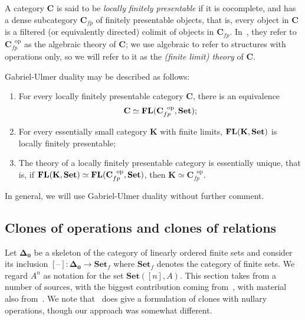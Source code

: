 \documentclass[11pt, a4paper, twoside,leqno]{amsart}
\newcommand{\cat}[1]{\mathbf{#1}}
\newcommand{\thg}{{\mathord{\text{--}}}}
\numberwithin{equation}{section}
\theoremstyle{plain}
\theoremstyle{definition}
\newcommand{\Set}{\cat{Set}}
\DeclareMathOperator{\FL}{\bf FL}
\begin{document}
A category \(\cat{C}\) is said to be \emph{locally finitely presentable} if it is
cocomplete, and has a dense subcategory \(\cat{C}_{fp}\) of finitely
presentable objects, that is, every object in \(\cat{C}\) is a filtered (or equivalently
directed) colimit of objects in \(\cat{C}_{fp}\).
In~\cite{Adamek:1998aa}, they refer to \(\cat{C}_{fp}^{\;\;\mathrm{op}}\)
as the algebraic theory of \(\cat{C}\); we use algebraic
to refer to structures with operations only, so we
will refer to it as the \emph{(finite limit) theory} of \(\cat{C}\).

Gabriel-Ulmer duality may be described as follows:
\begin{enumerate}[label=(\Roman*), ref=(\Roman*)]
  \item
    \label{it:lfp-to-th}
    For every locally finitely presentable category \(\cat{C}\), there is
an equivalence
\begin{equation*}
  \cat{C} \simeq \FL(\cat{C}_{fp}^{\;\;\mathrm{op}},\Set);
\end{equation*}
\item
  \label{it:th-to-lfp}
  For every essentially small category \(\cat{K}\) with finite
limits, \(\FL(\cat{K},\Set)\) is locally finitely
presentable;
\item
  \label{it:th-lfp-unique}
  The theory of a locally finitely presentable category is essentially
  unique, that is, if \( \FL(\cat{K},\Set) \simeq
\FL(\cat{C}_{fp}^{\;\;\mathrm{op}},\Set)\), then
\(\cat{K}\simeq \cat{C}_{fp}^{\;\;\mathrm{op}}\).
\end{enumerate}

In general, we will use Gabriel-Ulmer duality without further comment.


\subsection{Clones of operations and clones of relations}
\label{sec:clones-rel-clones}

Let \(\cat{\Delta_{0}}\) be a skeleton of the category of linearly
ordered finite
sets and consider its inclusion \([\thg] \colon
\cat{\Delta_{0}} \rightarrow \cat{Set}_{f}\) where \(\cat{Set}_{f}\) denotes
the category of finite sets. We regard \(A^{n}\) as notation for the
set \(\Set([n],A)\). This section takes from a number of sources, with
the biggest contribution coming from~\cite{Freese:2022aa}, with
material also from~\cite{Kerkhoff:2014aa}. We note
  that~\cite{Behrisch:2014aa} does give a formulation of clones with
  nullary operations, though our approach was somewhat different.
\end{document}
